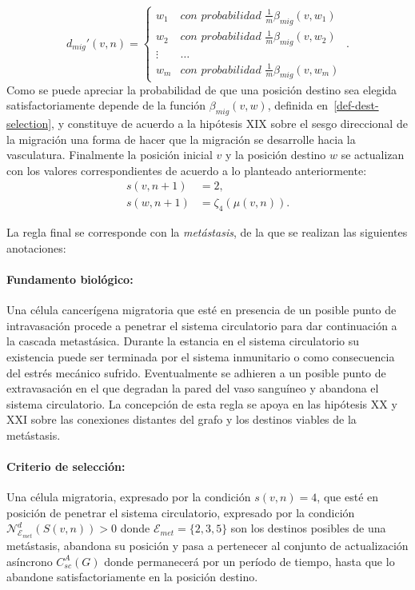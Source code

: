 \begin{equation*}
d_{mig}'(v,n) = \left\lbrace
	\begin{array}{ll}
		w_1 & \textit{con probabilidad } \frac{1}{m} \beta_{mig}(v,w_1)\\
		w_2 & \textit{con probabilidad } \frac{1}{m} \beta_{mig}(v,w_2)\\
		\vdots & \ldots\\
		w_m & \textit{con probabilidad } \frac{1}{m} \beta_{mig}(v,w_m)
	\end{array}\
\right..
\end{equation*}
Como se puede apreciar la probabilidad de que una posici\'on destino sea elegida satisfactoriamente depende de la funci\'on $\beta_{mig}(v,w)$, definida en~\ref{def-dest-selection}, y constituye de acuerdo a la hip\'otesis XIX sobre el sesgo direccional de la migraci\'on una forma de hacer que la migraci\'on se desarrolle hacia la vasculatura. Finalmente la posici\'on inicial $v$ y la posici\'on destino $w$ se actualizan con los valores correspondientes de acuerdo a lo planteado anteriormente:
\begin{align*}
s(v,n+1) &= 2,\\
s(w,n+1) &= \zeta_4(\mu(v,n)). 
\end{align*}\vspace*{0.5cm}

La regla final se corresponde con la \emph{met\'astasis}, de la que se realizan las siguientes anotaciones:\label{NOT-metastasis}

\paragraph*{{Fundamento biol\'ogico}:} Una c\'elula cancer\'igena migratoria que est\'e en presencia de un posible punto de intravasaci\'on procede a penetrar el sistema circulatorio para dar continuaci\'on a la cascada metast\'asica. Durante la estancia en el sistema circulatorio su existencia puede ser terminada por el sistema inmunitario o como consecuencia del estr\'es mec\'anico sufrido. Eventualmente se adhieren a un posible punto de extravasaci\'on en el que degradan la pared del vaso sangu\'ineo y abandona el sistema circulatorio. La concepci\'on de esta regla se apoya en las hip\'otesis XX y XXI sobre las conexiones distantes del grafo y los destinos viables de la met\'astasis.

\paragraph*{{Criterio de selecci\'on}:} Una c\'elula migratoria, expresado por la condici\'on $s(v,n)=4$, que est\'e en posici\'on de penetrar el sistema circulatorio, expresado por la condici\'on $\mathcal{N}_{\mathcal{E}_{met}}^d(S(v,n))>0$ donde $\mathcal{E}_{met}=\lbrace 2,3,5 \rbrace$ son los destinos posibles de una met\'astasis, abandona su posici\'on y pasa a pertenecer al conjunto de actualizaci\'on as\'incrono $C_{sc}^A(G)$ donde permanecer\'a por un per\'iodo de tiempo, hasta que lo abandone satisfactoriamente en la posici\'on destino.

